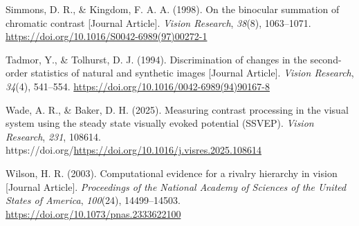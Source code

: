 \documentclass[
  12pt,
]{article}
\newlength{\cslhangindent}
\newenvironment{CSLReferences}[2] %
 {\begin{list}{}{%
  \setlength{\itemindent}{0pt}
  \setlength{\leftmargin}{0pt}
  \setlength{\parsep}{0pt}
  \ifodd #1
   \setlength{\leftmargin}{\cslhangindent}
   \setlength{\itemindent}{-1\cslhangindent}
  \fi
  \setlength{\itemsep}{#2\baselineskip}}}
 {\end{list}}
\begin{document}
\begin{CSLReferences}{1}{0}
Simmons, D. R., \& Kingdom, F. A. A. (1998). On the binocular summation
of chromatic contrast {[}Journal Article{]}. \emph{Vision Research},
\emph{38}(8), 1063--1071.
\url{https://doi.org/10.1016/S0042-6989(97)00272-1}

Tadmor, Y., \& Tolhurst, D. J. (1994). Discrimination of changes in the
second-order statistics of natural and synthetic images {[}Journal
Article{]}. \emph{Vision Research}, \emph{34}(4), 541--554.
\url{https://doi.org/10.1016/0042-6989(94)90167-8}

Wade, A. R., \& Baker, D. H. (2025). Measuring contrast processing in
the visual system using the steady state visually evoked potential
(SSVEP). \emph{Vision Research}, \emph{231}, 108614.
https://doi.org/\url{https://doi.org/10.1016/j.visres.2025.108614}

Wilson, H. R. (2003). Computational evidence for a rivalry hierarchy in
vision {[}Journal Article{]}. \emph{Proceedings of the National Academy
of Sciences of the United States of America}, \emph{100}(24),
14499--14503. \url{https://doi.org/10.1073/pnas.2333622100}

\end{CSLReferences}
\end{document}
